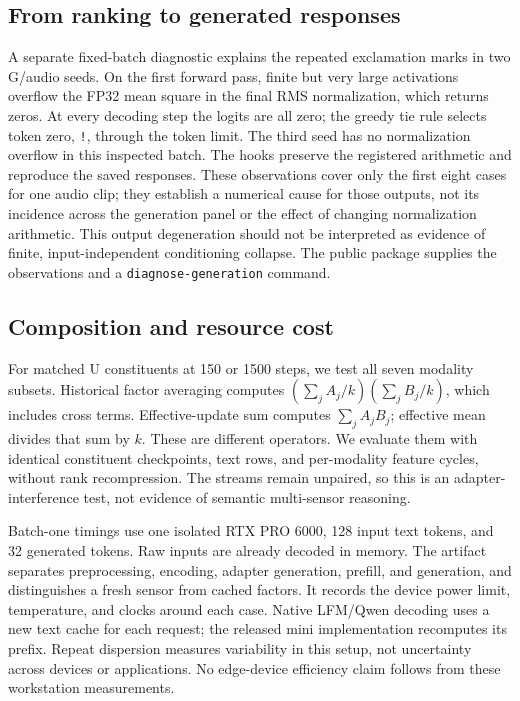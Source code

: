 \documentclass[11pt]{article}
\begin{document}
\FloatBarrier
\subsection{From ranking to generated responses}


\FloatBarrier


A separate fixed-batch diagnostic explains the repeated exclamation marks in
two G/audio seeds. On the first forward pass, finite but very large activations
overflow the FP32 mean square in the final RMS normalization, which returns
zeros. At every decoding step the logits are all zero; the greedy tie rule
selects token zero, \texttt{!}, through the token limit. The third seed has no
normalization overflow in this inspected batch. The hooks preserve the
registered arithmetic and reproduce the saved responses. These observations
cover only the first eight cases for one audio clip; they establish a numerical
cause for those outputs, not its incidence across the generation panel or the
effect of changing normalization arithmetic. This output degeneration should
not be interpreted as evidence of finite, input-independent conditioning
collapse. The public package supplies the observations and a
\texttt{diagnose-generation} command.


\FloatBarrier
\subsection{Composition and resource cost}
\label{sec:cost}
For matched U constituents at 150 or 1500 steps, we test all seven modality
subsets. Historical factor averaging computes
$(\sum_j A_j/k)(\sum_j B_j/k)$, which includes cross terms. Effective-update sum
computes $\sum_j A_jB_j$; effective mean divides that sum by $k$. These are
different operators. We evaluate them with identical constituent checkpoints,
text rows, and per-modality feature cycles, without rank recompression. The
streams remain unpaired, so this is an adapter-interference test, not evidence
of semantic multi-sensor reasoning.




Batch-one timings use one isolated RTX PRO 6000, 128 input text tokens, and
32 generated tokens. Raw inputs are already decoded in memory. The artifact
separates preprocessing, encoding, adapter generation, prefill, and generation,
and distinguishes a fresh sensor from cached factors. It records the device
power limit, temperature, and clocks around each case. Native LFM/Qwen decoding
uses a new text cache for each request; the released mini implementation
recomputes its prefix. Repeat dispersion measures variability in this setup,
not uncertainty across devices or applications. No edge-device efficiency
claim follows from these workstation measurements.
\end{document}
